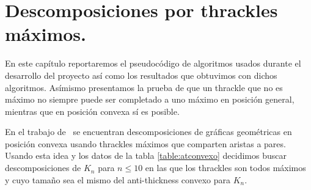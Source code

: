 


\section{Descomposiciones por thrackles máximos.}

En este capítulo reportaremos el pseudocódigo de algoritmos usados durante el desarrollo
del proyecto así como los resultados que obtuvimos con dichos algoritmos.
Asímismo presentamos la prueba de que un thrackle que no es máximo no siempre
puede ser completado a uno máximo en posición general, mientras que en posición
convexa sí es posible.

En el trabajo de~\cite{Fabila-Monroy2018} se encuentran descomposiciones de gráficas
geométricas en posición convexa usando thrackles máximos que comparten aristas a pares.
Usando esta idea y los datos de la tabla \ref{table:atconvexo} decidimos
buscar descomposiciones de $K_n$ para $n \leq 10$ en las que los thrackles
son todos máximos y cuyo tamaño sea el mismo del anti-thickness convexo para $K_n$.

